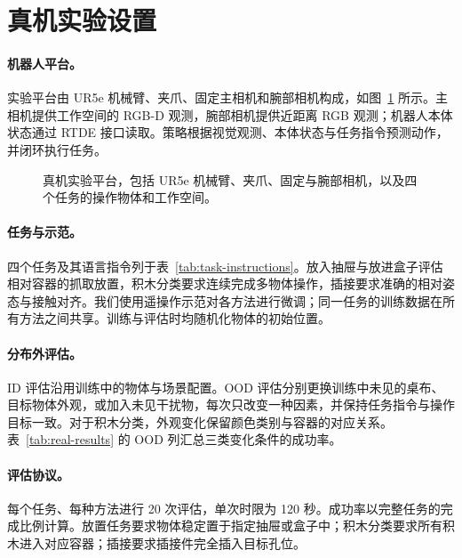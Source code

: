 \section{真机实验设置}
\label{sec:real-appendix}

\paragraph{机器人平台。}
实验平台由 UR5e 机械臂、夹爪、固定主相机和腕部相机构成，如图~\ref{fig:hardware} 所示。主相机提供工作空间的 RGB-D 观测，腕部相机提供近距离 RGB 观测；机器人本体状态通过 RTDE 接口读取。策略根据视觉观测、本体状态与任务指令预测动作，并闭环执行任务。

\begin{figure}[H]
\centering
\setlength{\fboxsep}{0pt}
\caption{真机实验平台，包括 UR5e 机械臂、夹爪、固定与腕部相机，以及四个任务的操作物体和工作空间。}
\label{fig:hardware}
\end{figure}

\paragraph{任务与示范。}
四个任务及其语言指令列于表~\ref{tab:task-instructions}。放入抽屉与放进盒子评估相对容器的抓取放置，积木分类要求连续完成多物体操作，插接要求准确的相对姿态与接触对齐。我们使用遥操作示范对各方法进行微调；同一任务的训练数据在所有方法之间共享。训练与评估时均随机化物体的初始位置。



\paragraph{分布外评估。}
ID 评估沿用训练中的物体与场景配置。OOD 评估分别更换训练中未见的桌布、目标物体外观，或加入未见干扰物，每次只改变一种因素，并保持任务指令与操作目标一致。对于积木分类，外观变化保留颜色类别与容器的对应关系。表~\ref{tab:real-results} 的 OOD 列汇总三类变化条件的成功率。

\paragraph{评估协议。}
每个任务、每种方法进行 20 次评估，单次时限为 120 秒。成功率以完整任务的完成比例计算。放置任务要求物体稳定置于指定抽屉或盒子中；积木分类要求所有积木进入对应容器；插接要求插接件完全插入目标孔位。
